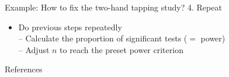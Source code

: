 \documentclass[aspectratio=169]{beamer}
\begin{document}
\begin{frame}[fragile]{Example: How to fix the two-hand tapping study?}
  {4. Repeat}
\begin{itemize}
\item Do previous steps repeatedly\\
-- Calculate the proportion of significant tests ($=$ power)\\
-- Adjust $n$ to reach the preset power criterion
\end{itemize}
\end{frame}


% 
% 


% 
% 
% 
% 
% 




\begin{frame}{References}
\renewcommand{\bibfont}{\footnotesize}


\end{frame}
\end{document}
